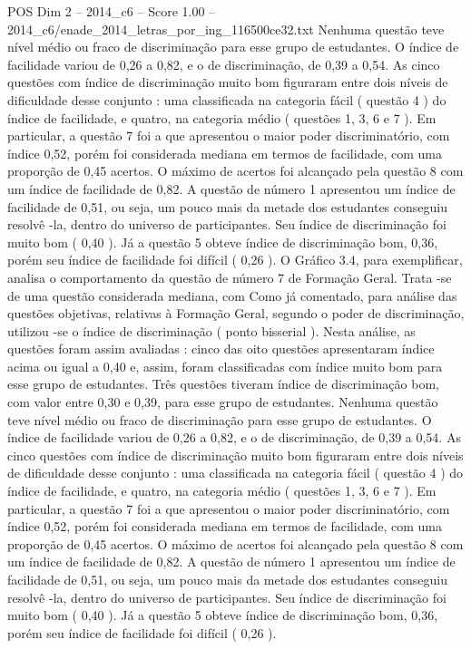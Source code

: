 \begin{textsample}{POS Dim 2 – 2014\_c6 – Score 1.00 – 2014\_c6/enade\_2014\_letras\_por\_ing\_116500ce32.txt}
Nenhuma questão teve nível médio ou fraco de discriminação para esse grupo de estudantes.
O índice de facilidade variou de 0,26 a 0,82, e o de discriminação, de 0,39 a 0,54.
As cinco questões com índice de discriminação muito bom figuraram entre dois níveis de dificuldade desse conjunto : uma classificada na categoria fácil ( questão 4 ) do índice de facilidade, e quatro, na categoria médio ( questões 1, 3, 6 e 7 ).
Em particular, a questão 7 foi a que apresentou o maior poder discriminatório, com índice 0,52, porém foi considerada mediana em termos de facilidade, com uma proporção de 0,45 acertos.
O máximo de acertos foi alcançado pela questão 8 com um índice de facilidade de 0,82.
A questão de número 1 apresentou um índice de facilidade de 0,51, ou seja, um pouco mais da metade dos estudantes conseguiu resolvê -la, dentro do universo de participantes.
Seu índice de discriminação foi muito bom ( 0,40 ).
Já a questão 5 obteve índice de discriminação bom, 0,36, porém seu índice de facilidade foi difícil ( 0,26 ).
O Gráfico 3.4, para exemplificar, analisa o comportamento da questão de número 7 de Formação Geral.
Trata -se de uma questão considerada mediana, com Como já comentado, para análise das questões objetivas, relativas à Formação Geral, segundo o poder de discriminação, utilizou -se o índice de discriminação ( ponto bisserial ).
Nesta análise, as questões foram assim avaliadas : cinco das oito questões apresentaram índice acima ou igual a 0,40 e, assim, foram classificadas com índice muito bom para esse grupo de estudantes.
Três questões tiveram índice de discriminação bom, com valor entre 0,30 e 0,39, para esse grupo de estudantes.
Nenhuma questão teve nível médio ou fraco de discriminação para esse grupo de estudantes.
O índice de facilidade variou de 0,26 a 0,82, e o de discriminação, de 0,39 a 0,54.
As cinco questões com índice de discriminação muito bom figuraram entre dois níveis de dificuldade desse conjunto : uma classificada na categoria fácil ( questão 4 ) do índice de facilidade, e quatro, na categoria médio ( questões 1, 3, 6 e 7 ).
Em particular, a questão 7 foi a que apresentou o maior poder discriminatório, com índice 0,52, porém foi considerada mediana em termos de facilidade, com uma proporção de 0,45 acertos.
O máximo de acertos foi alcançado pela questão 8 com um índice de facilidade de 0,82.
A questão de número 1 apresentou um índice de facilidade de 0,51, ou seja, um pouco mais da metade dos estudantes conseguiu resolvê -la, dentro do universo de participantes.
Seu índice de discriminação foi muito bom ( 0,40 ).
Já a questão 5 obteve índice de discriminação bom, 0,36, porém seu índice de facilidade foi difícil ( 0,26 ).

\end{textsample}
